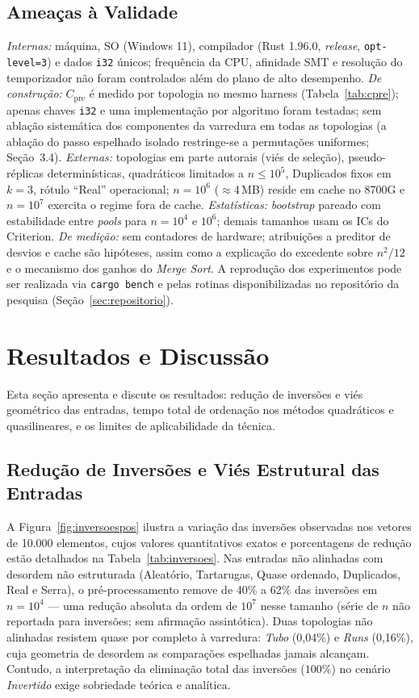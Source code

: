 \documentclass[portuguese]{sbc2025}%
\begin{document}
\subsection{Ameaças à Validade}

\emph{Internas:} máquina, SO (Windows 11), compilador (Rust 1.96.0, \emph{release}, \texttt{opt-level=3}) e dados \texttt{i32} únicos; frequência da CPU, afinidade SMT e resolução do temporizador não foram controlados além do plano de alto desempenho. \emph{De construção:} $C_{\text{pre}}$ é medido por topologia no mesmo harness (Tabela~\ref{tab:cpre}); apenas chaves \texttt{i32} e uma implementação por algoritmo foram testadas; sem ablação sistemática dos componentes da varredura em todas as topologias (a ablação do passo espelhado isolado restringe-se a permutações uniformes; Seção~3.4). \emph{Externas:} topologias em parte autorais (viés de seleção), pseudo-réplicas determinísticas, quadráticos limitados a $n{\le}10^5$, Duplicados fixos em $k{=}3$, rótulo ``Real'' operacional; $n{=}10^6$ ($\approx$4\,MB) reside em cache no 8700G e $n{=}10^7$ exercita o regime fora de cache. \emph{Estatísticas:} \emph{bootstrap} pareado com estabilidade entre \emph{pools} para $n{=}10^4$ e $10^6$; demais tamanhos usam os ICs do Criterion. \emph{De medição:} sem contadores de hardware; atribuições a preditor de desvios e cache são hipóteses, assim como a explicação do excedente sobre $n^2/12$ e o mecanismo dos ganhos do \emph{Merge Sort}. A reprodução dos experimentos pode ser realizada via \texttt{cargo bench} e pelas rotinas disponibilizadas no repositório da pesquisa (Seção~\ref{sec:repositorio}).

\section{Resultados e Discussão}\label{sec:res}

Esta seção apresenta e discute os resultados: redução de inversões e viés geométrico das entradas, tempo total de ordenação nos métodos quadráticos e quasilineares, e os limites de aplicabilidade da técnica.

\subsection{Redução de Inversões e Viés Estrutural das Entradas}

A Figura~\ref{fig:inversoespos} ilustra a variação das inversões observadas nos vetores de 10.000 elementos, cujos valores quantitativos exatos e porcentagens de redução estão detalhados na Tabela~\ref{tab:inversoes}. Nas entradas não alinhadas com desordem não estruturada (Aleatório, Tartarugas, Quase ordenado, Duplicados, Real e Serra), o pré-processamento remove de 40\% a 62\% das inversões em $n{=}10^4$ --- uma redução absoluta da ordem de $10^7$ nesse tamanho (série de $n$ não reportada para inversões; sem afirmação assintótica). Duas topologias não alinhadas resistem quase por completo à varredura: \emph{Tubo} (0{,}04\%) e \emph{Runs} (0{,}16\%), cuja geometria de desordem as comparações espelhadas jamais alcançam. Contudo, a interpretação da eliminação total das inversões ($100\%$) no cenário \emph{Invertido} exige sobriedade teórica e analítica.
\end{document}

